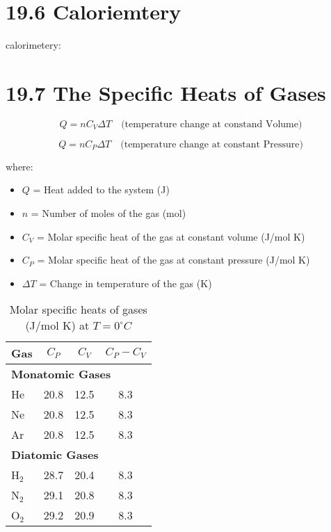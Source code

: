 \documentclass{article}
\begin{document}
\section*{19.6 Caloriemtery}

calorimetery: 


\section*{19.7 The Specific Heats of Gases}

\begin{equation}
    Q = nC_V \Delta T \quad \text{(temperature change at constand Volume)}
\end{equation}

\begin{equation}
    Q = nC_P \Delta T \quad \text{(temperature change at constant Pressure)}
\end{equation}

where:
\begin{itemize}
    \item $Q$ = Heat added to the system (J)
    \item $n$ = Number of moles of the gas (mol)
    \item $C_V$ = Molar specific heat of the gas at constant volume (J/mol K)
    \item $C_P$ = Molar specific heat of the gas at constant pressure (J/mol K)
    \item $\Delta T$ = Change in temperature of the gas (K)
\end{itemize}

\begin{table}[h]
    \centering
    \renewcommand{\arraystretch}{1.3}
    \setlength{\tabcolsep}{10pt}
    \begin{tabular}{lccc}
        \toprule
        \textbf{Gas} & $C_P$ & $C_V$ & $C_P - C_V$ \\
        \midrule
        \multicolumn{4}{l}{\textbf{Monatomic Gases}} \\
        He & 20.8 & 12.5 & 8.3 \\
        Ne & 20.8 & 12.5 & 8.3 \\
        Ar & 20.8 & 12.5 & 8.3 \\
        \midrule
        \multicolumn{4}{l}{\textbf{Diatomic Gases}} \\
        H$_2$ & 28.7 & 20.4 & 8.3 \\
        N$_2$ & 29.1 & 20.8 & 8.3 \\
        O$_2$ & 29.2 & 20.9 & 8.3 \\
        \bottomrule
    \end{tabular}
    \caption{Molar specific heats of gases (J/mol K) at $T = 0^\circ C$}
    \label{tab:specific_heats}
\end{table}
\end{document}
